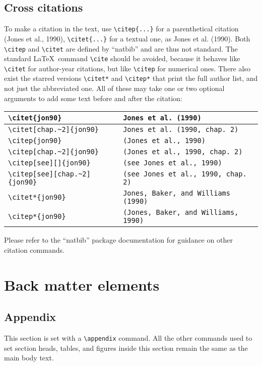 \documentclass{article}
\begin{document}
\subsection{Cross citations }
To make a citation in the text, use \verb+\citep{...}+ for a parenthetical citation (Jones et al., 1990), \verb+\citet{...}+ for a textual one, as Jones et al. (1990). Both \verb+\citep+ and \verb+\citet+ are defined by ``natbib'' and are thus not standard. The standard \LaTeX\ command \verb+\cite+ should be avoided, because it behaves like \verb+\citet+ for author-year citations, but like \verb+\citep+ for numerical ones. There also exist the starred versions \verb+\citet*+ and \verb+\citep*+ that print the full author list, and not just the abbreviated one. All of these may take one or two optional arguments to add some text before and after the citation:

\begin{center}\begin{tabular}{|l|l|}\hline
\verb+\citet{jon90}+&   \verb+Jones et al. (1990) +\\\hline
\verb+\citet[chap.~2]{jon90}+&  \verb+Jones et al. (1990, chap. 2) +\\\hline
\verb+\citep{jon90}+&   \verb+(Jones et al., 1990) +\\\hline
\verb+\citep[chap.~2]{jon90}+&  \verb+(Jones et al., 1990, chap. 2) +\\ \hline
\verb+\citep[see][]{jon90}+&    \verb+(see Jones et al., 1990) +\\\hline
\verb+\citep[see][chap.~2]{jon90}+&     \verb+(see Jones et al., 1990, chap. 2) +\\\hline
\verb+\citet*{jon90}+&  \verb+Jones, Baker, and Williams (1990) +\\\hline
\verb+\citep*{jon90}+&  \verb+(Jones, Baker, and Williams, 1990)+\\
\hline
\end{tabular}\end{center}
Please refer to the ``natbib'' package documentation for guidance on other citation commands.

\section{Back matter elements }
\subsection{Appendix}
This section is set with a \verb+\appendix+ command. All the other commands used to set section heads, tables, and figures inside this section remain the same as the main body text.
\end{document}
